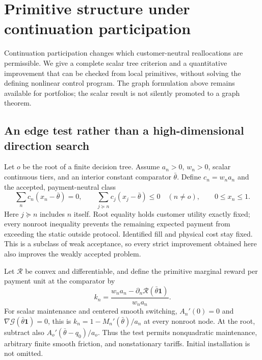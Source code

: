 \documentclass[11pt,letterpaper]{article}
\theoremstyle{definition}
\newcommand{\1}{\mathbf 1}
\begin{document}
\section{Primitive structure under continuation participation}\label{sec:r10-tree}
Continuation participation changes which customer-neutral reallocations are permissible. We give a complete scalar tree criterion and a quantitative improvement that can be checked from local primitives, without solving the defining nonlinear control program. The graph formulation above remains available for portfolios; the scalar result is not silently promoted to a graph theorem.

\subsection{An edge test rather than a high-dimensional direction search}
Let $o$ be the root of a finite decision tree. Assume $a_n>0$, $w_n>0$, scalar continuous tiers, and an interior constant comparator $\bar\theta$. Define $c_n=w_na_n$ and the accepted, payment-neutral class
\begin{equation}\label{eq:r10-subtrees}
 \sum_n c_n(x_n-\bar\theta)=0,\qquad
 \sum_{j\succeq n}c_j(x_j-\bar\theta)\leq0\quad(n\ne o),\qquad 0\leq x_n\leq1.
\end{equation}
Here $j\succeq n$ includes $n$ itself. Root equality holds customer utility exactly fixed; every nonroot inequality prevents the remaining expected payment from exceeding the static outside protocol. Identified fill and physical cost stay fixed. This is a subclass of weak acceptance, so every strict improvement obtained here also improves the weakly accepted problem.

Let $\mathcal R$ be convex and differentiable, and define the primitive marginal reward per payment unit at the comparator by
\begin{equation}\label{eq:r10-k}
 k_n=\frac{w_na_n-\partial_n\mathcal R(\bar\theta\mathbf1)}{w_na_n}.
\end{equation}
For scalar maintenance and centered smooth switching, $A_n'(0)=0$ and $\nabla\mathcal G(\bar\theta\mathbf1)=0$, this is $k_n=1-M_n'(\bar\theta)/a_n$ at every nonroot node. At the root, subtract also $A_o'(\bar\theta-q_0)/a_o$. Thus the test permits nonquadratic maintenance, arbitrary finite smooth friction, and nonstationary tariffs. Initial installation is not omitted.
\end{document}
